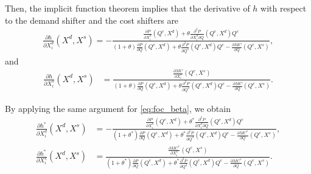 \documentclass[11pt, a4paper]{article}
\theoremstyle{remark}
\begin{document}
Then, the implicit function theorem implies that the derivative of $h$ with respect to the demand shifter and the cost shifters are
\begin{align}
    \frac{\partial h}{\partial X^{d}_{i}}(X^{d}, X^{s}) = -\frac{\frac{\partial P}{\partial X^{d}_{i}}(Q^e, X^{d}) + \theta\frac{\partial^2 P}{\partial X^{d}_{i}\partial Q}(Q^e, X^{d})Q^e }{(1+\theta)\frac{\partial P}{\partial Q}(Q^e, X^{d}) + \theta\frac{\partial^2 P}{\partial Q^2}(Q^e, X^{d})Q^e - \frac{\partial MC}{\partial Q}(Q^e, X^{s})}, \label{eq:foc_derivative_demand}
\end{align}
and
\begin{align}
    \frac{\partial h}{\partial X^{s}_{i}}(X^{d}, X^{s}) & = \frac{\frac{\partial MC}{\partial X^{s}_{i}}(Q^e, X^{s})}{(1+\theta)\frac{\partial P}{\partial Q}(Q^e, X^{d}) + \theta\frac{\partial^2 P}{\partial Q^2}(Q^e, X^{d})Q^e - \frac{\partial MC}{\partial Q}(Q^e, X^{s})}. \label{eq:foc_derivative_supply}
\end{align}


By applying the same argument for \eqref{eq:foc_beta}, we obtain 
\begin{align}
    \frac{\partial h^{*}}{\partial X^{d}_{i}}(X^{d}, X^{s}) &= -\frac{\frac{\partial P}{\partial X^{d}_{i}}(Q^e, X^{d}) + \theta^{*}\frac{\partial^2 P}{\partial X^{d}_{i}\partial Q}(Q^e, X^{d})Q^e }{(1+\theta^{*})\frac{\partial P}{\partial Q}(Q^e, X^{d}) + \theta^{*}\frac{\partial^2 P}{\partial Q^2}(Q^e, X^{d})Q^e - \frac{\partial MC^{*}}{\partial Q}(Q^e, X^{s})}, \\
    \frac{\partial h^{*}}{\partial X^{s}_{i}}(X^{d}, X^{s}) & = \frac{\frac{\partial MC^{*}}{\partial X^{s}_{i}}(Q^e, X^{s})}{(1+\theta^{*})\frac{\partial P}{\partial Q}(Q^e, X^{d}) + \theta^{*}\frac{\partial^2 P}{\partial Q^2}(Q^e, X^{d})Q^e - \frac{\partial MC^{*}}{\partial Q}(Q^e, X^{s})}.
\end{align}
\end{document}
